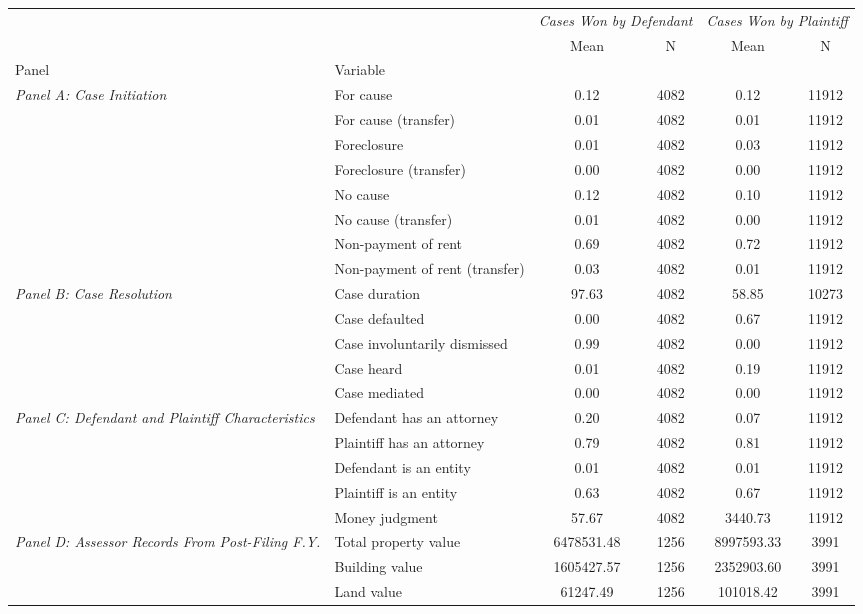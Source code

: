 \begin{tabular}{llcccc}
\toprule
 &  & \multicolumn{2}{c}{\textit{Cases Won by Defendant}} & \multicolumn{2}{c}{\textit{Cases Won by Plaintiff}} \\
 &  & Mean & N & Mean & N \\
Panel & Variable &  &  &  &  \\
\midrule
\multirow[c]{8}{4cm}{\textit{Panel A: Case Initiation}} & For cause & 0.12 & 4082 & 0.12 & 11912 \\
 & For cause (transfer) & 0.01 & 4082 & 0.01 & 11912 \\
 & Foreclosure & 0.01 & 4082 & 0.03 & 11912 \\
 & Foreclosure (transfer) & 0.00 & 4082 & 0.00 & 11912 \\
 & No cause & 0.12 & 4082 & 0.10 & 11912 \\
 & No cause (transfer) & 0.01 & 4082 & 0.00 & 11912 \\
 & Non-payment of rent & 0.69 & 4082 & 0.72 & 11912 \\
 & Non-payment of rent (transfer) & 0.03 & 4082 & 0.01 & 11912 \\
\cline{1-6}
\multirow[c]{5}{4cm}{\textit{Panel B: Case Resolution}} & Case duration & 97.63 & 4082 & 58.85 & 10273 \\
 & Case defaulted & 0.00 & 4082 & 0.67 & 11912 \\
 & Case involuntarily dismissed & 0.99 & 4082 & 0.00 & 11912 \\
 & Case heard & 0.01 & 4082 & 0.19 & 11912 \\
 & Case mediated & 0.00 & 4082 & 0.00 & 11912 \\
\cline{1-6}
\multirow[c]{5}{4cm}{\textit{Panel C: Defendant and Plaintiff Characteristics}} & Defendant has an attorney & 0.20 & 4082 & 0.07 & 11912 \\
 & Plaintiff has an attorney & 0.79 & 4082 & 0.81 & 11912 \\
 & Defendant is an entity & 0.01 & 4082 & 0.01 & 11912 \\
 & Plaintiff is an entity & 0.63 & 4082 & 0.67 & 11912 \\
 & Money judgment & 57.67 & 4082 & 3440.73 & 11912 \\
\cline{1-6}
\multirow[c]{5}{4cm}{\textit{Panel D: Assessor Records From Post-Filing F.Y.}} & Total property value & 6478531.48 & 1256 & 8997593.33 & 3991 \\
 & Building value & 1605427.57 & 1256 & 2352903.60 & 3991 \\
 & Land value & 61247.49 & 1256 & 101018.42 & 3991 \\

\end{tabular}
